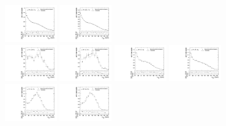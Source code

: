 \begin{figure}[htbp]
  \includegraphics[width=0.2\textwidth]{fig/analysis/templateVsReco_nonRes_r0_MJ_mu_LP_nobb_LDy.pdf}
  \includegraphics[width=0.2\textwidth]{fig/analysis/templateVsReco_nonRes_r0_MJ_e_LP_nobb_LDy.pdf}\\
  \includegraphics[width=0.2\textwidth]{fig/analysis/templateVsReco_nonRes_r0_MJ_mu_HP_vbf_LDy.pdf}
  \includegraphics[width=0.2\textwidth]{fig/analysis/templateVsReco_nonRes_r0_MJ_e_HP_vbf_LDy.pdf}
  \includegraphics[width=0.2\textwidth]{fig/analysis/templateVsReco_nonRes_r0_MJ_mu_LP_vbf_LDy.pdf}
  \includegraphics[width=0.2\textwidth]{fig/analysis/templateVsReco_nonRes_r0_MJ_e_LP_vbf_LDy.pdf}\\
  \includegraphics[width=0.2\textwidth]{fig/analysis/templateVsReco_nonRes_r0_MJ_mu_HP_bb_HDy.pdf}
  \includegraphics[width=0.2\textwidth]{fig/analysis/templateVsReco_nonRes_r0_MJ_e_HP_bb_HDy.pdf}

\end{figure}
